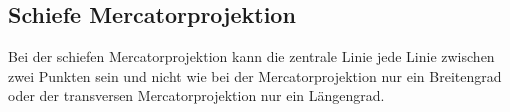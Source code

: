 \subsection{Schiefe Mercatorprojektion}
\label{sec:schiefmerc}
Bei der schiefen Mercatorprojektion kann die zentrale Linie jede Linie zwischen zwei Punkten sein und nicht wie bei der Mercatorprojektion nur ein Breitengrad oder der transversen Mercatorprojektion nur ein Längengrad.